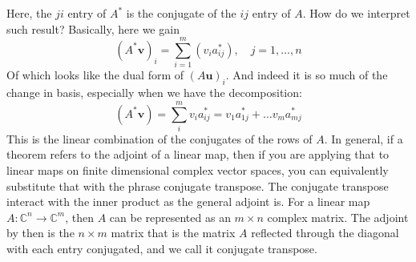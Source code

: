 Here, the $ji$ entry of $A^{*}$ is the conjugate of the $ij$ entry of $A$. How do we interpret such result? Basically, here we gain \begin{equation}
    (A^{*}\mathbf{v})_{i} = \sum^{m}_{i=1} (v_{i}a_{ij}^{*}), \quad j = 1,\dots, n
\end{equation}
Of which looks like the dual form of $(A\mathbf{u})_{i}$. And indeed it is so much of the change in basis, especially when we have the decomposition: 
\begin{equation}
    (A^{*}\mathbf{v}) = \sum^{m}_{i} v_{i}a^{*}_{ij} = v_{1} a^{*}_{1j} + \dots v_{m}a_{mj}^{*} 
\end{equation}
This is the linear combination of the conjugates of the rows of $A$. In general, if a theorem refers to the adjoint of a linear map, then if you are applying that to linear maps on finite dimensional complex vector spaces, you can equivalently substitute that with the phrase conjugate transpose. The conjugate transpose interact with the inner product as the general adjoint is. For a linear map $A:\mathbb{C}^{n}\to\mathbb{C}^{m}$, then $A$ can be represented as an $m\times n$ complex matrix. The adjoint by then is the $n\times m$ matrix that is the matrix $A$ reflected through the diagonal with each entry conjugated, and we call it conjugate transpose. 
